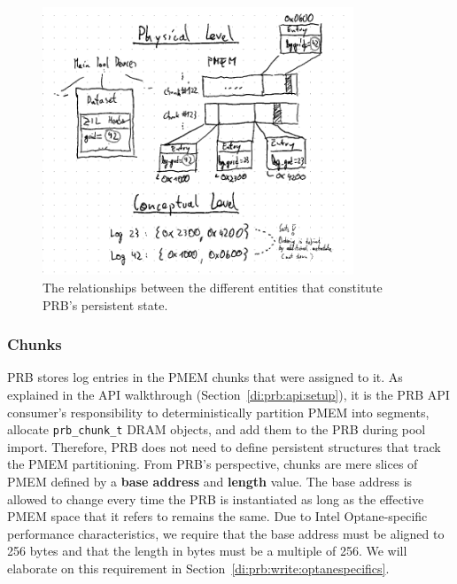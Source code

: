 \documentclass[12pt,a4paper,twoside]{book}
\begin{document}
\begin{figure}
    \centering
    \includegraphics[height=8cm]{fig/prb_physical_data_structure_entities}
    \caption{
        The relationships between the different entities that constitute PRB's persistent state.
    }
    \label{fig:prb_physical_data_structure_entities}
\end{figure}


\subsubsection{Chunks}\label{di:prb:persistent:chunks}
PRB stores log entries in the PMEM chunks that were assigned to it.
As explained in the API walkthrough (Section~\ref{di:prb:api:setup}), it is the PRB API consumer's responsibility to deterministically partition PMEM into segments, allocate \lstinline{prb_chunk_t} DRAM objects, and add them to the PRB during pool import.
Therefore, PRB does not need to define persistent structures that track the PMEM partitioning.
From PRB's perspective, chunks are mere slices of PMEM defined by a \textbf{base address} and \textbf{length} value.
The base address is allowed to change every time the PRB is instantiated as long as the effective PMEM space that it refers to remains the same.
Due to Intel Optane-specific performance characteristics, we require that the base address must be aligned to 256 bytes and that the length in bytes must be a multiple of 256.
We will elaborate on this requirement in Section~\ref{di:prb:write:optanespecifics}.
\end{document}
